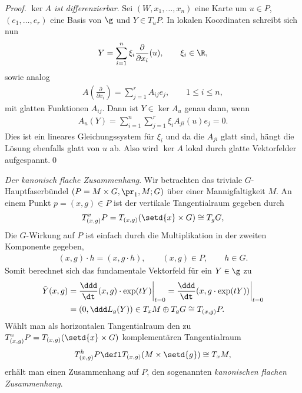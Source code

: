 \documentclass[%
	paper=a5,%
	fleqn,%
	DIV=18,%
	BCOR=0mm,
	fontsize=11pt,
	titlepage=false,%
	bibliography=totoc,
	DIV=18,%
	twoside=true,
	pdftitle=Riemannsche Geometrie,
	pdfauthor=Uwe Semmelmann,
	numbers=noendperiod]%
	{scrbook}
\begin{document}
\begin{proof}
\textit{$\ker A$ ist differenzierbar}. Sei $(W,x_1,\ldots,x_n)$ eine Karte um
$u\in P$, $(e_1,\ldots,e_r)$ eine Basis von $\g$ und $Y\in T_uP$. In lokalen
Koordinaten schreibt sich nun
\begin{align*}
Y = \sum_{i=1}^n \xi_i \frac{\partial}{\partial x_i}(u),\qquad \xi_i\in \R,
\end{align*}
sowie analog
\begin{align*}
A\left(\frac{\partial}{\partial x_i} \right) = 
\sum_{j=1}^r A_{ij} e_j,\qquad 1\le i\le n,
\end{align*}
mit glatten Funktionen $A_{ij}$. Dann ist $Y\in \ker A_u$ genau dann, wenn
\begin{align*}
A_u(Y) = \sum_{i=1}^n\sum_{j=1}^r \xi_i A_{ji}(u)e_j = 0. 
\end{align*}
Dies ist ein lineares Gleichungssystem für $\xi_i$ und da die $A_{ji}$ glatt
sind, hängt die Lösung ebenfalls glatt von $u$ ab. Also wird $\ker A$ lokal
durch glatte Vektorfelder aufgespannt.\qed
\end{proof}

\begin{ex}
\textit{Der kanonisch flache Zusammenhang}.
Wir betrachten das triviale $G$-Hauptfaserbündel $(P=M\times G,\pr_1,M;G)$ über
einer Mannigfaltigkeit $M$. An einem Punkt $p=(x,g)\in P$ ist der
vertikale Tangentialraum gegeben durch
\begin{align*}
T^v_{(x,g)}P = T_{(x,g)}(\setd{x}\times G) \cong T_gG,
\end{align*}
Die $G$-Wirkung auf $P$ ist einfach durch die
Multiplikation in der zweiten Komponente gegeben,
\begin{align*}
(x,g)\cdot h = (x,g\cdot h),\qquad (x,g)\in P,\qquad h\in G.
\end{align*}
Somit berechnet sich das fundamentale Vektorfeld für ein $Y\in \g$ zu
\begin{align*}
\tilde{Y}(x,g) &= \frac{\ddd}{\dt} (x,g)\cdot \exp(tY)\bigg|_{t=0}
= \frac{\ddd}{\dt} (x,g\cdot \exp(tY))\bigg|_{t=0}\\
&= (0,\ddd L_g(Y)) \in T_{x}M\oplus T_gG \cong T_{(x,g)}P.
\end{align*}
Wählt man als horizontalen Tangentialraum den zu $T^v_{(x,g)}P =
T_{(x,g)}(\setd{x}\times G)$ komplementären Tangentialraum
\begin{align*}
T^h_{(x,g)}P \defl T_{(x,g)}(M\times \setd{g}) \cong T_xM,
\end{align*}
erhält man einen Zusammenhang auf $P$, den sogenannten \emph{kanonischen
flachen Zusammenhang}.\boxc
\end{ex}
\end{document}
